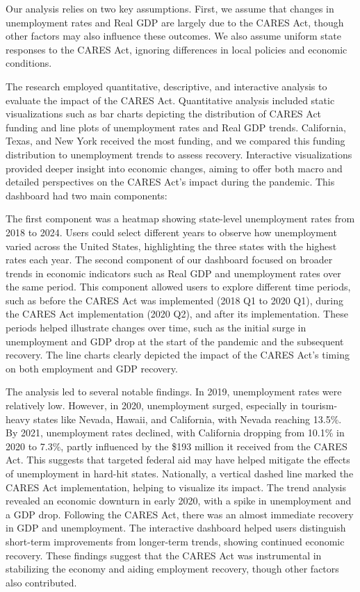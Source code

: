 \documentclass[
]{article}
\begin{document}
Our analysis relies on two key assumptions. First, we assume that
changes in unemployment rates and Real GDP are largely due to the CARES
Act, though other factors may also influence these outcomes. We also
assume uniform state responses to the CARES Act, ignoring differences in
local policies and economic conditions.

The research employed quantitative, descriptive, and interactive
analysis to evaluate the impact of the CARES Act. Quantitative analysis
included static visualizations such as bar charts depicting the
distribution of CARES Act funding and line plots of unemployment rates
and Real GDP trends. California, Texas, and New York received the most
funding, and we compared this funding distribution to unemployment
trends to assess recovery. Interactive visualizations provided deeper
insight into economic changes, aiming to offer both macro and detailed
perspectives on the CARES Act's impact during the pandemic. This
dashboard had two main components:

The first component was a heatmap showing state-level unemployment rates
from 2018 to 2024. Users could select different years to observe how
unemployment varied across the United States, highlighting the three
states with the highest rates each year. The second component of our
dashboard focused on broader trends in economic indicators such as Real
GDP and unemployment rates over the same period. This component allowed
users to explore different time periods, such as before the CARES Act
was implemented (2018 Q1 to 2020 Q1), during the CARES Act
implementation (2020 Q2), and after its implementation. These periods
helped illustrate changes over time, such as the initial surge in
unemployment and GDP drop at the start of the pandemic and the
subsequent recovery. The line charts clearly depicted the impact of the
CARES Act's timing on both employment and GDP recovery.

The analysis led to several notable findings. In 2019, unemployment
rates were relatively low. However, in 2020, unemployment surged,
especially in tourism-heavy states like Nevada, Hawaii, and California,
with Nevada reaching 13.5\%. By 2021, unemployment rates declined, with
California dropping from 10.1\% in 2020 to 7.3\%, partly influenced by
the \$193 million it received from the CARES Act. This suggests that
targeted federal aid may have helped mitigate the effects of
unemployment in hard-hit states. Nationally, a vertical dashed line
marked the CARES Act implementation, helping to visualize its impact.
The trend analysis revealed an economic downturn in early 2020, with a
spike in unemployment and a GDP drop. Following the CARES Act, there was
an almost immediate recovery in GDP and unemployment. The interactive
dashboard helped users distinguish short-term improvements from
longer-term trends, showing continued economic recovery. These findings
suggest that the CARES Act was instrumental in stabilizing the economy
and aiding employment recovery, though other factors also contributed.
\end{document}
